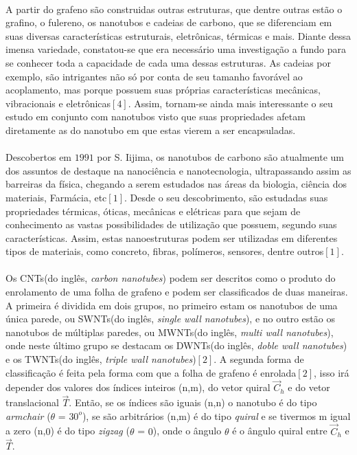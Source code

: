 \documentclass[12pt,a4paper]{report}
\begin{document}
\paragraph{}
A partir do grafeno são construidas outras estruturas, que dentre outras estão o grafino, o fulereno, os nanotubos e cadeias de carbono, que se diferenciam em suas diversas características estruturais, eletrônicas, térmicas e mais. Diante dessa imensa variedade, constatou-se que era necessário uma investigação a fundo para se conhecer toda a capacidade de cada uma dessas estruturas. As cadeias por exemplo, são intrigantes não só por conta de seu tamanho favorável ao acoplamento, mas porque possuem suas próprias características mecânicas, vibracionais e eletrônicas$[4]$. Assim, tornam-se ainda mais interessante o seu estudo em conjunto com nanotubos visto que suas propriedades afetam diretamente as do nanotubo em que estas vierem a ser encapsuladas.
\paragraph{} Descobertos em $1991$ por S. Iijima, os nanotubos de carbono são atualmente um dos assuntos de destaque na nanociência e nanotecnologia, ultrapassando assim as barreiras da física, chegando a serem estudados nas áreas da biologia, ciência dos materiais, Farmácia, etc$[1]$. Desde o seu descobrimento, são estudadas suas propriedades térmicas, óticas, mecânicas e elétricas para que sejam de conhecimento as vastas possibilidades de utilização que possuem, segundo suas características. Assim, estas nanoestruturas podem ser utilizadas em diferentes tipos de materiais, como concreto, fibras, polímeros, sensores, dentre outros$[1]$.  
\paragraph{} Os CNTs(do inglês, \textit{carbon nanotubes}) podem ser descritos como o produto do enrolamento de uma folha de grafeno e podem ser classificados de duas maneiras. A primeira é dividida em dois grupos, no primeiro estam os nanotubos de uma única parede, ou SWNTs(do inglês, \textit{single wall nanotubes}), e no outro estão os nanotubos de múltiplas paredes, ou MWNTs(do inglês, \textit{multi wall nanotubes}), onde neste último grupo se destacam os DWNTs(do inglês, \textit{doble wall nanotubes}) e os TWNTs(do inglês, \textit{triple wall nanotubes})$[2]$. A segunda forma de classificação é feita pela forma com que a folha de grafeno é enrolada$[2]$, isso irá depender dos valores dos índices inteiros (n,m), do vetor quiral $\vec{C}_h$ e do vetor translacional $\vec{T}$. Então, se os índices são iguais (n,n) o nanotubo é do tipo \textit{armchair} (\textit{$\theta$} = $30^{o}$), se são arbitrários (n,m) é do tipo \textit{quiral}  e se tivermos m igual a zero (n,$0$) é do tipo \textit{zigzag} (\textit{$\theta$} = $0$), onde o ângulo $\theta$ é o ângulo quiral entre $\vec{C}_h$ e $\vec{T}$.
\end{document}

